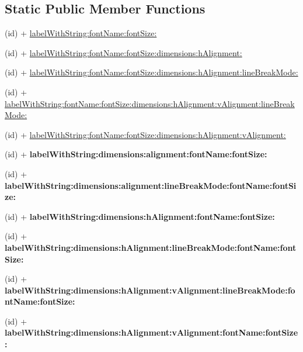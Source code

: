 \subsection*{Static Public Member Functions}
\begin{DoxyCompactItemize}
\item 
(id) + \hyperlink{class_c_c_label_t_t_f_a6c64d1e4acb9cc83a5dec2f60bdaae4e}{label\-With\-String\-:font\-Name\-:font\-Size\-:}
\item 
(id) + \hyperlink{class_c_c_label_t_t_f_a40f9c9dcb8ded2bd993ff3d66511c6e7}{label\-With\-String\-:font\-Name\-:font\-Size\-:dimensions\-:h\-Alignment\-:}
\item 
(id) + \hyperlink{class_c_c_label_t_t_f_a327e9df4128bf1dd6af2659f5418086f}{label\-With\-String\-:font\-Name\-:font\-Size\-:dimensions\-:h\-Alignment\-:line\-Break\-Mode\-:}
\item 
(id) + \hyperlink{class_c_c_label_t_t_f_a8e7f1f2a0b62ece11c1d425543756d10}{label\-With\-String\-:font\-Name\-:font\-Size\-:dimensions\-:h\-Alignment\-:v\-Alignment\-:line\-Break\-Mode\-:}
\item 
(id) + \hyperlink{class_c_c_label_t_t_f_a207c000cc2a8f8ce8b731d1665067dac}{label\-With\-String\-:font\-Name\-:font\-Size\-:dimensions\-:h\-Alignment\-:v\-Alignment\-:}
\item 
\hypertarget{class_c_c_label_t_t_f_a6e81dada9cd5b8984c2464e3ddd9879b}{(id) + {\bfseries label\-With\-String\-:dimensions\-:alignment\-:font\-Name\-:font\-Size\-:}}\label{class_c_c_label_t_t_f_a6e81dada9cd5b8984c2464e3ddd9879b}

\item 
\hypertarget{class_c_c_label_t_t_f_a602fabcb1f7cc0fed57f9a2dcb84e3e6}{(id) + {\bfseries label\-With\-String\-:dimensions\-:alignment\-:line\-Break\-Mode\-:font\-Name\-:font\-Size\-:}}\label{class_c_c_label_t_t_f_a602fabcb1f7cc0fed57f9a2dcb84e3e6}

\item 
\hypertarget{class_c_c_label_t_t_f_a8e7d51036ed9a0f2c751733d318fa45b}{(id) + {\bfseries label\-With\-String\-:dimensions\-:h\-Alignment\-:font\-Name\-:font\-Size\-:}}\label{class_c_c_label_t_t_f_a8e7d51036ed9a0f2c751733d318fa45b}

\item 
\hypertarget{class_c_c_label_t_t_f_a5e9ec99bf553ebb5373e377b5af13227}{(id) + {\bfseries label\-With\-String\-:dimensions\-:h\-Alignment\-:line\-Break\-Mode\-:font\-Name\-:font\-Size\-:}}\label{class_c_c_label_t_t_f_a5e9ec99bf553ebb5373e377b5af13227}

\item 
\hypertarget{class_c_c_label_t_t_f_a64bfd2bf85d98ce2f54ec128ad70c100}{(id) + {\bfseries label\-With\-String\-:dimensions\-:h\-Alignment\-:v\-Alignment\-:line\-Break\-Mode\-:font\-Name\-:font\-Size\-:}}\label{class_c_c_label_t_t_f_a64bfd2bf85d98ce2f54ec128ad70c100}

\item 
\hypertarget{class_c_c_label_t_t_f_ac7c21b64a40f6dfcccbd8452e2607516}{(id) + {\bfseries label\-With\-String\-:dimensions\-:h\-Alignment\-:v\-Alignment\-:font\-Name\-:font\-Size\-:}}\label{class_c_c_label_t_t_f_ac7c21b64a40f6dfcccbd8452e2607516}

\end{DoxyCompactItemize}
